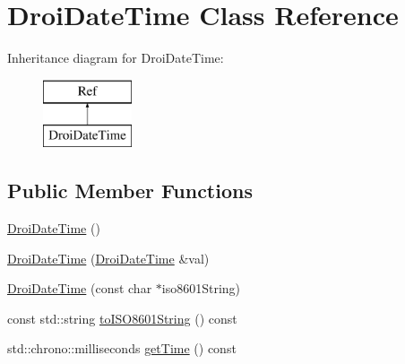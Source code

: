 \hypertarget{class_droi_date_time}{}\section{Droi\+Date\+Time Class Reference}
\label{class_droi_date_time}
Inheritance diagram for Droi\+Date\+Time\+:\begin{figure}[H]
\begin{center}
\leavevmode
\includegraphics[height=2.000000cm]{d1/dd2/class_droi_date_time}
\end{center}
\end{figure}
\subsection*{Public Member Functions}
\begin{DoxyCompactItemize}
\item 
\hyperlink{class_droi_date_time_ab9363f1db1a719280e9efb26a04d2f3d}{Droi\+Date\+Time} ()
\item 
\hyperlink{class_droi_date_time_ad94e01e84b3805bf9ecfb45181bb8352}{Droi\+Date\+Time} (\hyperlink{class_droi_date_time}{Droi\+Date\+Time} \&val)
\item 
\hyperlink{class_droi_date_time_acf75158fb769f5b4cf5f28992f96e722}{Droi\+Date\+Time} (const char $\ast$iso8601\+String)
\item 
const std\+::string \hyperlink{class_droi_date_time_ad4b6059b573aeaf19c488dc210282e82}{to\+I\+S\+O8601\+String} () const
\item 
std\+::chrono\+::milliseconds \hyperlink{class_droi_date_time_ac6f5fc92adafe06844461ae961e476b1}{get\+Time} () const
\end{DoxyCompactItemize}
